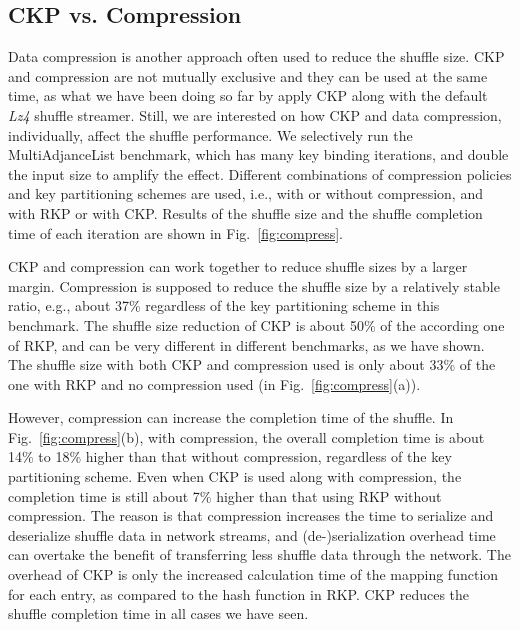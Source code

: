 \documentclass[10pt,journal,compsoc]{IEEEtran}
\begin{document}
\subsection{CKP vs. Compression}
Data compression is another approach often used to reduce the shuffle size. 
CKP and compression are not mutually exclusive and they can be used at the 
same time, as what we have been doing so far by apply CKP along with  
the default \emph{Lz4} shuffle streamer. 
Still, we are interested on how CKP and data compression, 
individually, affect the shuffle performance. 
We selectively run the MultiAdjanceList benchmark, which has many key binding iterations, and double the input size to amplify the effect.
Different combinations of compression policies and key partitioning
schemes are used, i.e., with or without compression, and with RKP or with
CKP. Results of the shuffle size and the shuffle completion time of each iteration
are shown in Fig.~\ref{fig:compress}. 

CKP and compression can work together to reduce shuffle sizes by a larger margin. 
Compression is supposed to reduce the shuffle size by a relatively
stable ratio, e.g., about 37\% regardless of the key partitioning scheme 
in this benchmark. 
The shuffle size reduction of CKP is about 50\% of the according one of RKP, 
and can be very different in different benchmarks, as we have shown. 
The shuffle size with both CKP and compression used is only about 33\% of 
the one with RKP and no compression used (in Fig.~\ref{fig:compress}(a)). 

However, compression can increase the completion time of the shuffle. 
In Fig.~\ref{fig:compress}(b), with compression, 
the overall completion time is about 14\% to 18\% higher than that 
without compression, regardless of the key partitioning scheme. 
Even when CKP is used along with compression, the completion time is still
about 7\% higher than that using RKP without compression.  
The reason is that compression increases the time to serialize and deserialize
shuffle data in network streams, and (de-)serialization overhead time can
overtake the benefit of transferring less shuffle data through the network.
The overhead of CKP is only the increased calculation time of the mapping function
for each entry, as compared to the hash function in RKP. 
CKP reduces the shuffle completion time in all cases we have seen. 
\end{document}
